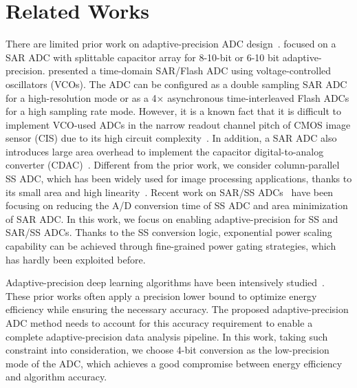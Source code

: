 \section{Related Works}\label{related}

There are limited prior work on adaptive-precision ADC design~\cite{zhu_06_2013,zhu_6--10-bit_2015,yip_resolution-reconfigurable_2013,el-halwagy_100-mss5-gss_2018}. 
\cite{zhu_06_2013,yip_resolution-reconfigurable_2013,zhu_6--10-bit_2015} focused on a SAR ADC with splittable capacitor array for 8-10-bit or 6-10 bit adaptive-precision. 
\cite{el-halwagy_100-mss5-gss_2018} presented a time-domain SAR/Flash ADC using voltage-controlled oscillators (VCOs). The ADC can be configured as a double sampling SAR ADC for a high-resolution mode or as a 4× asynchronous time-interleaved Flash ADCs for a high sampling rate mode.
However, it is a known fact that it is difficult to implement VCO-used ADCs in the narrow readout channel pitch of CMOS image sensor (CIS) due to its high circuit complexity~\cite{kim_area-efficient_2016}. In addition, a SAR ADC also introduces large area overhead to implement the capacitor digital-to-analog converter (CDAC)~\cite{funatsu_62_2015}.
Different from the prior work, we consider column-parallel SS ADC, which has been widely used for image processing applications, 
thanks to its small area and high linearity~\cite{kim_11-bit_2021,nie_single_2020,kumagai_14-inch_2018,park_640_2020}. 
Recent work on SAR/SS ADCs~\cite{kim_area-efficient_2016,chen_12_2014} have been focusing on reducing the A/D conversion time of 
SS ADC and area minimization of SAR ADC.     
In this work, we focus on enabling adaptive-precision for SS and SAR/SS ADCs. Thanks to the SS conversion logic, exponential power 
scaling capability can be achieved through fine-grained power gating strategies, which has hardly been exploited before.


Adaptive-precision deep learning algorithms have been intensively studied~\cite{leibe_xnor-net_2016,li_ternary_2016,park_energy-efficient_2018}. These prior works often apply a precision lower bound to optimize energy efficiency while ensuring the necessary accuracy.  The proposed adaptive-precision ADC method needs to account for this accuracy requirement to enable a complete adaptive-precision data analysis pipeline. In this work, taking such constraint into consideration, we choose 4-bit conversion as the low-precision mode of the ADC, which achieves a good compromise between energy efficiency and algorithm accuracy. 


